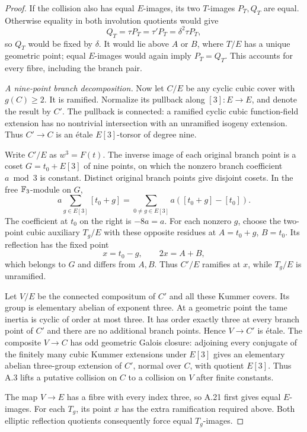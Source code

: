 \begin{proof}
If the collision also has equal $E$-images, its two
$T$-images $P_T,Q_T$ are equal. Otherwise equality in
both involution quotients would give
\[
 Q_T=\tau P_T=\tau'P_T=\delta^2\tau P_T,
\]
so $Q_T$ would be fixed by $\delta$. It would lie above
$A$ or $B$, where $T/E$ has a unique geometric point;
equal $E$-images would again imply $P_T=Q_T$.
This accounts for every fibre, including the branch pair.

\emph{A nine-point branch decomposition.}
Now let $C/E$ be any cyclic cubic cover with $g(C)\ge2$.
It is ramified. Normalize its pullback along $[3]:E\to E$,
and denote the result by $C'$. The pullback is connected:
a ramified cyclic cubic function-field extension has no
nontrivial intersection with an unramified isogeny
extension. Thus $C'\to C$ is an \'{e}tale $E[3]$-torsor
of degree nine.

Write $C'/E$ as $w^3=F(t)$. The inverse image of each
original branch point is a coset $G=t_0+E[3]$ of nine
points, on which the nonzero branch coefficient
$a\bmod3$ is constant. Distinct original branch points
give disjoint cosets. In the free $\mathbb F_3$-module on $G$,
\[
 a\sum_{g\in E[3]}[t_0+g]
   =\sum_{0\ne g\in E[3]}a([t_0+g]-[t_0]).               \tag{A.46}
\]
The coefficient at $t_0$ on the right is $-8a=a$.
For each nonzero $g$, choose the two-point cubic auxiliary
$T_g/E$ with these opposite residues at
$A=t_0+g$, $B=t_0$. Its reflection has the fixed point
\[
 x=t_0-g,\qquad 2x=A+B,
\]
which belongs to $G$ and differs from $A,B$.
Thus $C'/E$ ramifies at $x$, while $T_g/E$ is unramified.

Let $V/E$ be the connected compositum of $C'$ and all
these Kummer covers. Its group is elementary abelian
of exponent three. At a geometric point the tame inertia
is cyclic of order at most three. It has order exactly
three at every branch point of $C'$ and there are no
additional branch points. Hence $V\to C'$ is \'{e}tale.
The composite $V\to C$ has odd geometric Galois closure:
adjoining every conjugate of the finitely many cubic
Kummer extensions under $E[3]$ gives an elementary abelian
three-group extension of $C'$, normal over $C$, with
quotient $E[3]$. Thus A.3 lifts a putative collision on
$C$ to a collision on $V$ after finite constants.

The map $V\to E$ has a fibre with every index three, so
A.21 first gives equal $E$-images. For each $T_g$, its
point $x$ has the extra ramification required above.
Both elliptic reflection quotients consequently force
equal $T_g$-images.


\end{proof}
